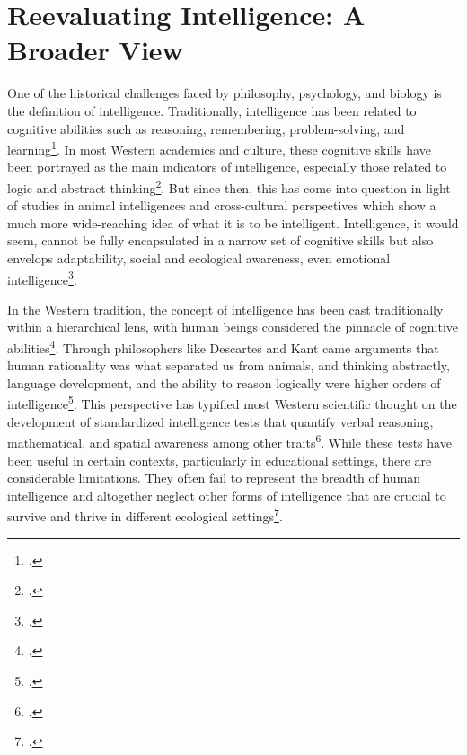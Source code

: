 \documentclass[12pt]{article}
\begin{document}
\newpage



\section{Reevaluating Intelligence: A Broader View}

One of the historical challenges faced by philosophy, psychology, and biology is the definition of intelligence. Traditionally, intelligence has been related to cognitive abilities such as reasoning, remembering, problem-solving, and learning\footcite{sternberg2004wisdom}. In most Western academics and culture, these cognitive skills have been portrayed as the main indicators of intelligence, especially those related to logic and abstract thinking\footcite{gardner1999intelligence}. But since then, this has come into question in light of studies in animal intelligences and cross-cultural perspectives which show a much more wide-reaching idea of what it is to be intelligent. Intelligence, it would seem, cannot be fully encapsulated in a narrow set of cognitive skills but also envelops adaptability, social and ecological awareness, even emotional intelligence\footcite{goleman1995emotional}.

In the Western tradition, the concept of intelligence has been cast traditionally within a hierarchical lens, with human beings considered the pinnacle of cognitive abilities\footcite{aristotle1986nicomachean}. Through philosophers like Descartes and Kant came arguments that human rationality was what separated us from animals, and thinking abstractly, language development, and the ability to reason logically were higher orders of intelligence\footcite{descartes1996discourse}. This perspective has typified most Western scientific thought on the development of standardized intelligence tests that quantify verbal reasoning, mathematical, and spatial awareness among other traits\footcite{sternberg2004wisdom}. While these tests have been useful in certain contexts, particularly in educational settings, there are considerable limitations. They often fail to represent the breadth of human intelligence and altogether neglect other forms of intelligence that are crucial to survive and thrive in different ecological settings\footcite{gardner1999intelligence}.
\end{document}
